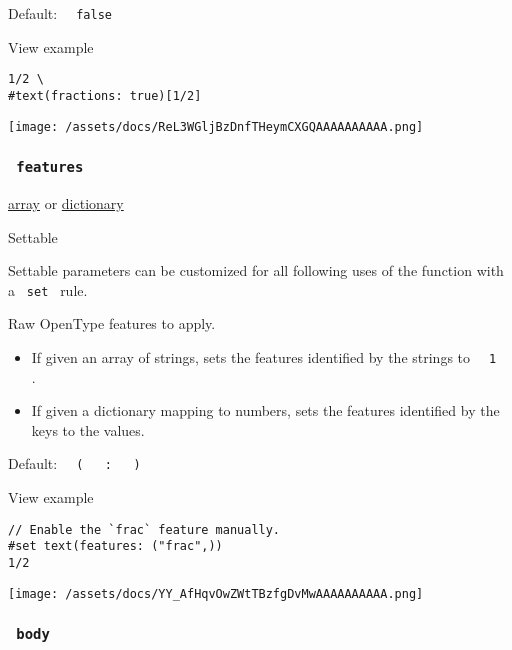 Default: \texttt{\ }{\texttt{\ false\ }}\texttt{\ }


View example

\begin{verbatim}
1/2 \
#text(fractions: true)[1/2]
\end{verbatim}

\texttt{[image: /assets/docs/ReL3WGljBzDnfTHeymCXGQAAAAAAAAAA.png]}

\subsubsection{\texorpdfstring{\texttt{\ features\ }}{ features }}\label{parameters-features}

\href{/docs/reference/foundations/array/}{array} {or}
\href{/docs/reference/foundations/dictionary/}{dictionary}

{{ Settable }}

\label{parameters-features-settable-tooltip}
Settable parameters can be customized for all following uses of the
function with a \texttt{\ set\ } rule.

Raw OpenType features to apply.

\begin{itemize}
\tightlist
\item
  If given an array of strings, sets the features identified by the
  strings to \texttt{\ }{\texttt{\ 1\ }}\texttt{\ } .
\item
  If given a dictionary mapping to numbers, sets the features identified
  by the keys to the values.
\end{itemize}

Default:
\texttt{\ }{\texttt{\ (\ }}\texttt{\ }{\texttt{\ :\ }}\texttt{\ }{\texttt{\ )\ }}\texttt{\ }


View example

\begin{verbatim}
// Enable the `frac` feature manually.
#set text(features: ("frac",))
1/2
\end{verbatim}

\texttt{[image: /assets/docs/YY\_AfHqvOwZWtTBzfgDvMwAAAAAAAAAA.png]}

\subsubsection{\texorpdfstring{\texttt{\ body\ }}{ body }}\label{parameters-body}

